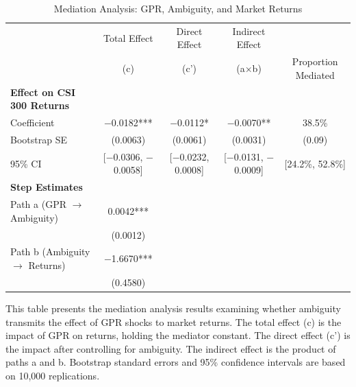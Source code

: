\documentclass[preprint,12pt,authoryear]{elsarticle}
\begin{document}
\begin{table}
\centering
\caption{Mediation Analysis: GPR, Ambiguity, and Market Returns}
\label{tab:mediation}
\begin{threeparttable}
\begin{tabular*}{\textwidth}{@{\extracolsep{\fill}} lcccc @{\extracolsep{\fill}}}
\toprule
& Total Effect & Direct Effect & Indirect Effect & \\
& (c) & (c') & (a$\times$b) & Proportion Mediated \\
\midrule
\midrule
\textbf{Effect on CSI 300 Returns} & & & & \\
Coefficient & $-$0.0182*** & $-$0.0112* & $-$0.0070** & 38.5\% \\
Bootstrap SE & (0.0063) & (0.0061) & (0.0031) & (0.09) \\
95\% CI & [$-$0.0306, $-$0.0058] & [$-$0.0232, 0.0008] & [$-$0.0131, $-$0.0009] & [24.2\%, 52.8\%] \\
\midrule
\textbf{Step Estimates} & & & & \\
Path a (GPR $\rightarrow$ Ambiguity) & 0.0042*** & & & \\
& (0.0012) & & & \\
Path b (Ambiguity $\rightarrow$ Returns) & $-$1.6670*** & & & \\
& (0.4580) & & & \\
\bottomrule
\end{tabular*}
\begin{tablenotes}[flushleft]
\small
\item[] This table presents the mediation analysis results examining whether ambiguity transmits the effect of GPR shocks to market returns. The total effect (c) is the impact of GPR on returns, holding the mediator constant. The direct effect (c') is the impact after controlling for ambiguity. The indirect effect is the product of paths a and b. Bootstrap standard errors and 95\% confidence intervals are based on 10,000 replications.
\end{tablenotes}
\end{threeparttable}
\end{table}
\end{document}
